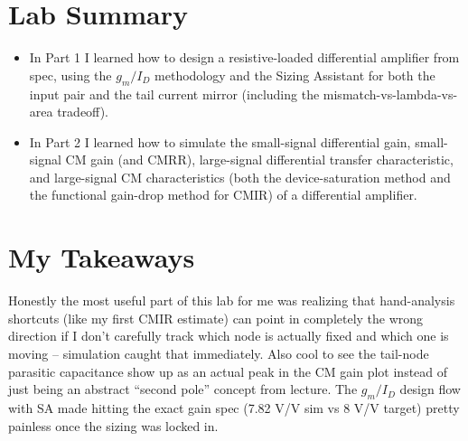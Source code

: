 \documentclass[11pt]{article}
\begin{document}
\newpage
\section{Lab Summary}
\begin{itemize}[leftmargin=*]
  \item In Part 1 I learned how to design a resistive-loaded differential amplifier from spec, using the
  $g_m/I_D$ methodology and the Sizing Assistant for both the input pair and the tail current mirror
  (including the mismatch-vs-lambda-vs-area tradeoff).
  \item In Part 2 I learned how to simulate the small-signal differential gain, small-signal CM gain
  (and CMRR), large-signal differential transfer characteristic, and large-signal CM characteristics
  (both the device-saturation method and the functional gain-drop method for CMIR) of a differential
  amplifier.
\end{itemize}

\section*{My Takeaways}
Honestly the most useful part of this lab for me was realizing that hand-analysis shortcuts (like my first
CMIR estimate) can point in completely the wrong direction if I don't carefully track which node is actually
fixed and which one is moving -- simulation caught that immediately. Also cool to see the tail-node parasitic
capacitance show up as an actual peak in the CM gain plot instead of just being an abstract ``second pole''
concept from lecture. The $g_m/I_D$ design flow with SA made hitting the exact gain spec (7.82 V/V sim vs
8 V/V target) pretty painless once the sizing was locked in.
\end{document}
